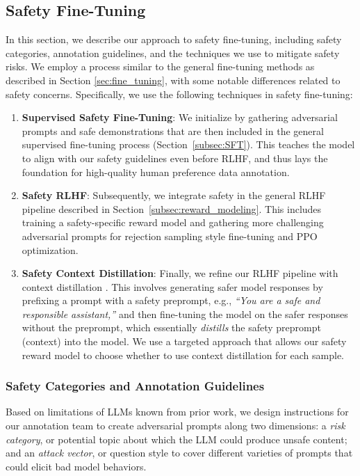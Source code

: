 \documentclass{article}
\begin{document}
\subsection{Safety Fine-Tuning}
\label{sec:safety_alignment}

In this section, we describe our approach to safety fine-tuning, including safety categories, annotation guidelines, and the techniques we use to mitigate safety risks.
We employ a process similar to the general fine-tuning methods as described in Section \ref{sec:fine_tuning}, with some notable differences related to safety concerns. Specifically, we use the following techniques in safety fine-tuning:
\begin{enumerate}
    \item \textbf{Supervised Safety Fine-Tuning}: We initialize by gathering adversarial prompts and safe demonstrations that are then included in the general supervised fine-tuning process (Section~\ref{subsec:SFT}). This teaches the model to align with our safety guidelines even before RLHF, and thus lays the foundation for high-quality human preference data annotation.
    \item \textbf{Safety RLHF}: Subsequently, we integrate safety in the general RLHF pipeline described in Section~\ref{subsec:reward_modeling}. This includes training a safety-specific reward model and gathering more challenging adversarial prompts for rejection sampling style fine-tuning and PPO optimization.
    \item \textbf{Safety Context Distillation}: Finally, we refine our RLHF pipeline with context distillation \citep{askell2021general}. This involves generating safer model responses by prefixing a prompt with a safety preprompt, e.g., \textit{``You are a safe and responsible assistant,''} and then fine-tuning the model on the safer responses without the preprompt, which essentially \textit{distills} the safety preprompt (context) into the model. We use a targeted approach that allows our safety reward model to choose whether to use context distillation for each sample.
\end{enumerate}

\subsubsection{Safety Categories and Annotation Guidelines} \label{sec:safety_guidelines}

Based on limitations of LLMs known from prior work, we design instructions for our annotation team to create adversarial prompts along two dimensions: a \textit{risk category}, or potential topic about which the LLM could produce unsafe content; and an \textit{attack vector}, or question style to cover different varieties of prompts that could elicit bad model behaviors. 
\end{document}
